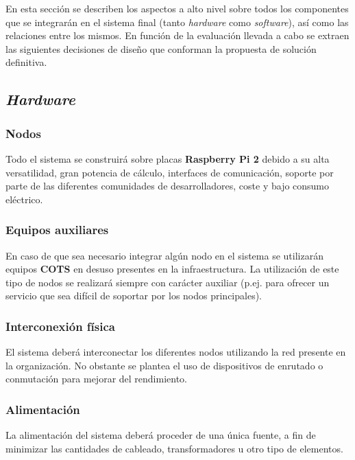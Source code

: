 En esta sección se describen los aspectos a alto nivel sobre todos los componentes que se integrarán en el sistema final (tanto \textit{hardware} como \textit{software}), así como las relaciones entre los mismos. En función de la evaluación llevada a cabo se extraen las siguientes decisiones de diseño que conforman la propuesta de solución definitiva.

\subsection{\textit{Hardware}}

\subsubsection{Nodos}

Todo el sistema se construirá sobre placas \textbf{Raspberry Pi 2} debido a su alta versatilidad, gran potencia de cálculo, interfaces de comunicación, soporte por parte de las diferentes comunidades de desarrolladores, coste y bajo consumo eléctrico.

\subsubsection{Equipos auxiliares}

En caso de que sea necesario integrar algún nodo en el sistema se utilizarán equipos \textbf{COTS} en desuso presentes en la infraestructura. La utilización de este tipo de nodos se realizará siempre con carácter auxiliar (p.ej. para ofrecer un servicio que sea difícil de soportar por los nodos principales).

\subsubsection{Interconexión física}

El sistema deberá interconectar los diferentes nodos utilizando la red presente en la organización. No obstante se plantea el uso de dispositivos de enrutado o conmutación para mejorar del rendimiento.

\subsubsection{Alimentación}

La alimentación del sistema deberá proceder de una única fuente, a fin de minimizar las cantidades de  cableado, transformadores u otro tipo de elementos.


